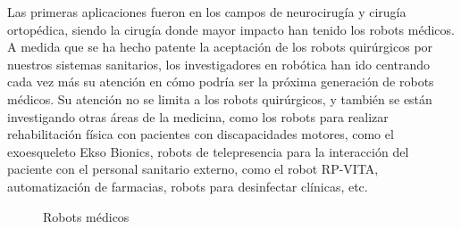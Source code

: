 Las primeras aplicaciones fueron en los campos de neurocirugía y cirugía ortopédica, siendo la cirugía donde mayor impacto han tenido los robots médicos. A medida que se ha hecho patente la aceptación de los robots quirúrgicos por nuestros sistemas sanitarios, los investigadores en robótica han ido centrando cada vez más su atención en cómo podría ser la próxima generación de robots médicos. Su atención no se limita a los robots quirúrgicos, y también se están investigando otras áreas de la medicina, como los robots para realizar rehabilitación física con pacientes con discapacidades motores, como el exoesqueleto Ekso Bionics, robots de telepresencia para la interacción del paciente con el personal sanitario externo, como el robot RP-VITA, automatización de farmacias, robots para desinfectar clínicas, etc. \cite{Dupont21}\\

 \begin{figure}[h!]
    \begin{center}
      \subcapcentertrue
      \hspace{20mm}
    \end{center}
    \caption{Robots médicos}
    \label{fig:Robots_medicos}
  \end{figure}

